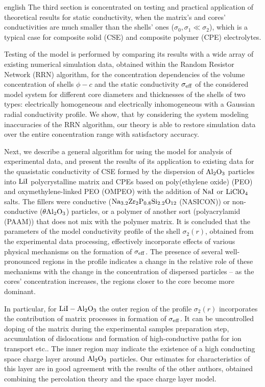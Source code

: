 \begin{otherlanguage*}{english}
The third section is concentrated on testing and practical application of theoretical results for static conductivity, when the matrix's and cores' conductivities are much smaller than the shells' ones ($ \sigma_ {0}, \sigma_1 \ll \sigma_2 $), which is a typical case for composite solid (CSE) and  composite polymer (CPE) electrolytes.

Testing of the model is performed by comparing its results with a wide array of existing numerical simulation data, obtained within the Random Resistor Network (RRN) algorithm, for the concentration dependencies of the volume concentration of shells $ \phi-c $ and the static conductivity $ \sigma _ {\rm eff} $ of the considered model system for different core diameters and thicknesses of the shells of two types: electrically homogeneous and electrically inhomogeneous with a Gaussian radial conductivity profile. We show, that by considering the system modeling inaccuracies of the RRN algorithm, our theory is able to restore simulation data over the entire concentration range with satisfactory accuracy.

Next, we describe a general algorithm for using the model for analysis of experimental data, and present the results of its application to existing data for the quasistatic conductivity of CSE formed by the dispersion of $ \rm Al_2O_3 $ particles into $ \rm LiI $ polycrystalline matrix and CPEs based on poly(ethylene oxide) (PEO) and oxymethylene-linked PEO (OMPEO) with the addition of $ \rm NaI $ or $ \rm LiClO_4 $ salts. The fillers were conductive ($ \rm Na_ {3.2} Zr_2P_ {0.8} Si_ {2.2} O_ {12} $ (NASICON)) or non-conductive ($ \rm \theta Al_2O_3 $) particles, or a polymer of another sort (polyacrylamid (PAAM)) that does not mix with the polymer matrix.
It is concluded that the parameters of the model conductivity profile of the shell $ \sigma_2 (r) $, obtained from the experimental data processing, effectively incorporate effects of various physical mechanisms on the formation of $\sigma_{\rm eff}$. The presence of several well-pronounced regions in the profile indicates a change in the relative role of these mechanisms with the change in the concentration of dispersed particles -- as the cores' concentration increases, the regions closer to the core become more dominant.

In particular, for $ \rm LiI-Al_2O_3 $ the outer region of the profile $ \sigma_2 (r) $ incorporates the contribution of matrix processes in formation of $ \sigma _ {\rm eff} $. It can be uncontrolled doping of the matrix during the experimental samples preparation step, accumulation of dislocations and formation of high-conductive paths for ion transport etc..
The inner region may indicate the existence of a high conducting space charge layer  around $ \rm Al_2O_3 $ particles. Our estimates for characteristics of this layer are in good agreement with the results of the other authors, obtained combining the percolation theory and the space charge layer model.


\end{otherlanguage*}
